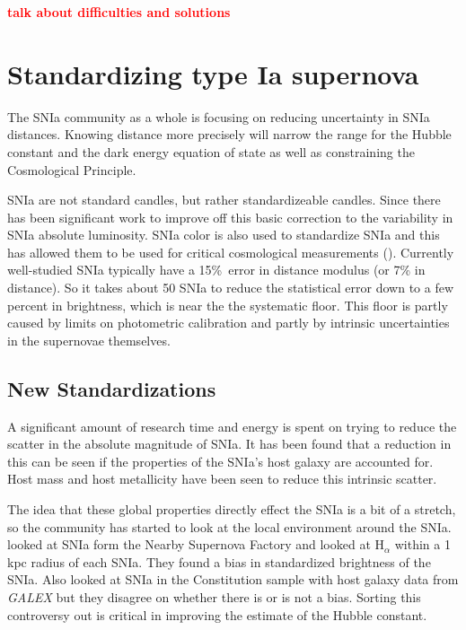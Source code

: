 \documentclass[apj, iop]{emulateapj}
\newcommand{\sn}{SNIa}
\newcommand{\todo}[1]{\textbf{\textcolor{red}{#1}}}
\begin{document}
\todo{talk about difficulties and solutions}

\section{Standardizing type Ia
supernova}\label{standardizing-type-ia-supernova}

The \sn{} community as a whole is focusing on reducing uncertainty in SNIa
distances. Knowing distance more precisely will narrow the range for the Hubble
constant and the dark energy equation of state as well as
constraining the Cosmological Principle.

\sn{} are not standard candles, but rather standardizeable candles. Since
\cite{Phillips93} there has been significant work to improve off this basic correction to the
variability in \sn{} absolute luminosity. \sn{} color is also used to standardize \sn{} and
this has allowed them to be used for critical cosmological measurements
(\citep{Riess98, Perlmutter99}). Currently well-studied \sn{} typically have a
15\%\ error in distance modulus (or 7\% in distance). So it takes about 50 SNIa
to reduce the statistical error down to a few percent in brightness, which is near the 
the systematic floor. This floor is partly caused by limits on photometric calibration and
partly by intrinsic uncertainties in the supernovae themselves.

\subsection{New Standardizations}\label{new-standardizations}

A significant amount of research time and energy is spent on trying to reduce
the scatter in the absolute magnitude of SNIa. It has been found that a
reduction in this can be seen if the properties of the SNIa's host galaxy are
accounted for. Host mass \citep{Childress13} and host metallicity \citep{Hayden13}
have been seen to reduce this intrinsic scatter.

The idea that these global properties directly effect the \sn{} is a bit of a
stretch, so the community has started to look at the local environment around
the SNIa. \cite{Rigault13} looked at \sn{} form the Nearby Supernova Factory and
looked at H$_{\alpha}$ within a 1 kpc radius of each SNIa. They found  a bias in
standardized brightness of the SNIa. Also \cite{Rigault15, Jones15} looked at
\sn{} in the Constitution sample with host galaxy data from {\it GALEX} but they
disagree on whether there is or is not a bias. Sorting this controversy out is
critical in improving the estimate of the Hubble constant.
\end{document}
